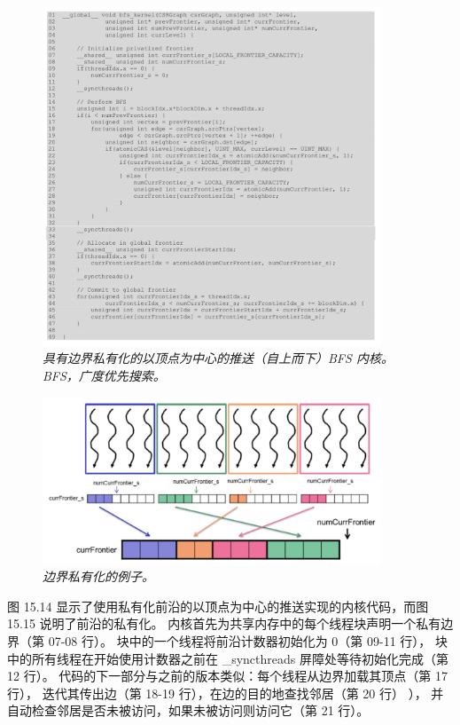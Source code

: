 \begin{figure}[H]
	\centering
	\includegraphics[width=0.9\textwidth]{figs/F15.14.png}
	\caption{\textit{具有边界私有化的以顶点为中心的推送（自上而下）BFS 内核。 BFS，广度优先搜索。}}
\end{figure}

\begin{figure}[H]
	\centering
	\includegraphics[width=0.9\textwidth]{figs/F15.15.png}
	\caption{\textit{边界私有化的例子。}}
\end{figure}

图 15.14 显示了使用私有化前沿的以顶点为中心的推送实现的内核代码，而图 15.15 说明了前沿的私有化。 
内核首先为共享内存中的每个线程块声明一个私有边界（第 07-08 行）。 
块中的一个线程将前沿计数器初始化为 0（第 09-11 行），
块中的所有线程在开始使用计数器之前在 \_syncthreads 屏障处等待初始化完成（第 12 行）。 
代码的下一部分与之前的版本类似：每个线程从边界加载其顶点（第 17 行），
迭代其传出边（第 18-19 行），在边的目的地查找邻居（第 20 行） ），
并自动检查邻居是否未被访问，如果未被访问则访问它（第 21 行）。

